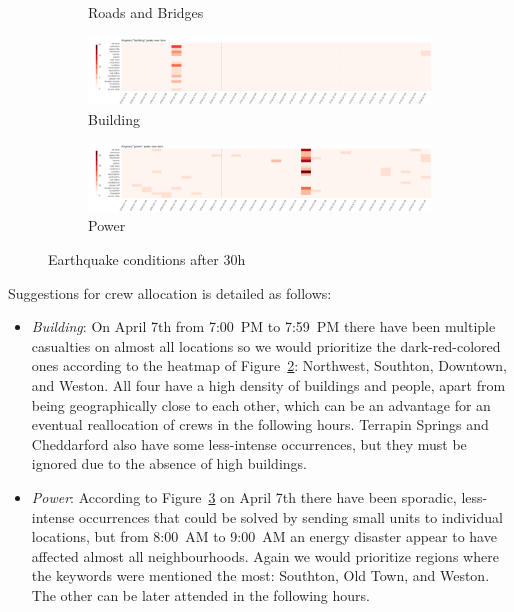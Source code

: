 \begin{figure}[!h]
\begin{subfigure}[!h]{0.24\textwidth}
        \caption{Roads and Bridges}
        \label{fig:roads_30h}
    \end{subfigure}
    \begin{subfigure}[!h]{0.98\textwidth}
        \centering
        \includegraphics[width=1.00\textwidth]{figs/cond_30h/cond_30h_build.png}
        \caption{Building}
        \label{fig:building_30h}
    \end{subfigure}
    \begin{subfigure}[!h]{0.98\textwidth}
        \centering
        \includegraphics[width=1.00\textwidth]{figs/cond_30h/cond_30h_power.png}
        \caption{Power}
        \label{fig:power_30h}
    \end{subfigure}
    \caption{Earthquake conditions after 30h}
    \label{fig:eq_cond_30h}
\end{figure}

Suggestions for crew allocation is detailed as follows:

\begin{itemize}
    \item \emph{Building}: On April 7th from 7:00~PM to 7:59~PM there have been
    multiple casualties on almost all locations so we would prioritize the
    dark-red-colored ones according to the heatmap of
    Figure~\ref{fig:building_30h}:
    Northwest, Southton, Downtown, and Weston. All four have a high 
    density of buildings and people, apart from being geographically close to
    each other, which can be an advantage for an eventual reallocation of crews
    in the following hours. Terrapin Springs and Cheddarford also have some
    less-intense occurrences, but they must be ignored due to the absence of
    high buildings.
    \item \emph{Power}: According to Figure~\ref{fig:power_30h} on April 7th 
    there have been sporadic, less-intense
    occurrences that could be solved by sending small units to individual
    locations, but from 8:00~AM to 9:00~AM an energy disaster appear to have
    affected almost all neighbourhoods. Again we would prioritize regions where
    the keywords were mentioned the most: Southton, Old Town, and Weston. The
    other can be later attended in the following hours.
\end{itemize}
